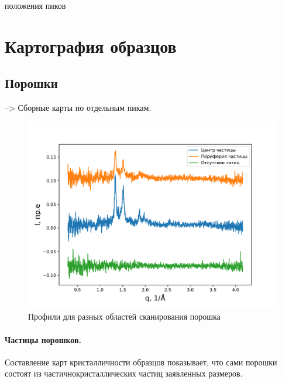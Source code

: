 	положения пиков
	
	

\section{Картография образцов}

\subsection{Порошки}

--> Сборные карты по отдельным пикам.



\begin{figure}[h]
    \centering
    \includegraphics[width = \linewidth]{fig/var-profile.pdf}
    \caption{Профили для разных областей сканирования порошка}
    \label{fig:var-profile}
\end{figure}


	
	\paragraph{Частицы порошков.}Составление карт кристалличности образцов показывает, что сами порошки состоят из частичнокристаллических частиц заявленных размеров.
	
